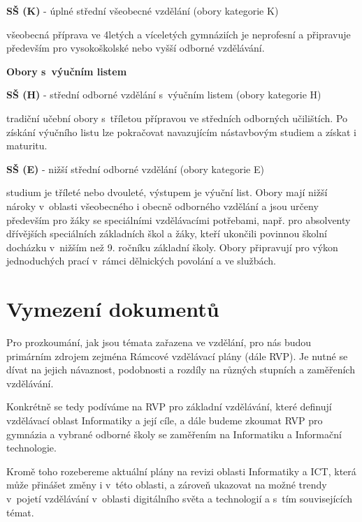 \textbf{SŠ (K)} - úplné střední všeobecné vzdělání (obory kategorie K)

\begin{displayquote}
všeobecná příprava ve 4letých a víceletých gymnáziích je neprofesní a připravuje především pro vysokoškolské nebo vyšší odborné vzdělávání.
\end{displayquote}

\textbf{Obory s~výučním listem}

\textbf{SŠ (H)} - střední odborné vzdělání s~výučním listem (obory kategorie H)

\begin{displayquote}
tradiční učební obory s~tříletou přípravou ve středních odborných učilištích. Po získání výučního listu lze pokračovat navazujícím nástavbovým studiem a získat i maturitu.
\end{displayquote}

\textbf{SŠ (E)} - nižší střední odborné vzdělání (obory kategorie E)

\begin{displayquote}
studium je tříleté nebo dvouleté, výstupem je výuční list. Obory mají nižší nároky v~oblasti všeobecného i obecně odborného vzdělání a jsou určeny především pro žáky se speciálními vzdělávacími potřebami, např. pro absolventy dřívějších speciálních základních škol a žáky, kteří ukončili povinnou školní docházku v~nižším než 9. ročníku základní školy. Obory připravují pro výkon jednoduchých prací v~rámci dělnických povolání a ve službách.
\end{displayquote}

\section{Vymezení dokumentů}

Pro prozkoumání, jak jsou témata zařazena ve vzdělání, pro nás budou primárním zdrojem zejména Rámcové vzdělávací plány (dále RVP). Je nutné se dívat na jejich návaznost, podobnosti a rozdíly na různých stupních a zaměřeních vzdělávání.

Konkrétně se tedy podíváme na RVP pro základní vzdělávání, které definují vzdělávací oblast Informatiky a její cíle, a dále budeme zkoumat RVP pro gymnázia a vybrané odborné školy se zaměřením na Informatiku a Informační technologie. 

Kromě toho rozebereme aktuální plány na revizi oblasti Informatiky a ICT, která může přinášet změny i v~této oblasti, a zároveň ukazovat na možné trendy v~pojetí vzdělávání v~oblasti digitálního světa a technologií a s~tím souvisejících témat.

